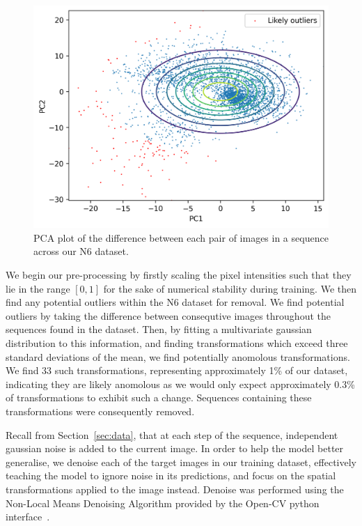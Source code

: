 \documentclass[twocolumn]{article}
\begin{document}
\begin{figure}
    \centering
    \includegraphics[scale=0.4]{assets/change-mag.png}
    \caption{PCA plot of the difference between each pair of images in a sequence across our N6 dataset.}
    \label{fig:change}
\end{figure}

We begin our pre-processing by firstly scaling the pixel intensities such that they lie in the range $[0, 1]$ for the sake of numerical stability during training. We then find any potential outliers within the N6 dataset for removal. We find potential outliers by taking the difference between consequtive images throughout the sequences found in the dataset. Then, by fitting a multivariate gaussian distribution to this information, and finding transformations which exceed three standard deviations of the mean, we find potentially anomolous transformations. We find 33 such transformations, representing approximately 1\% of our dataset, indicating they are likely anomolous as we would only expect approximately 0.3\% of transformations to exhibit such a change. Sequences containing these transformations were consequently removed.

Recall from Section~\ref{sec:data}, that at each step of the sequence, independent gaussian noise is added to the current image. In order to help the model better generalise, we denoise each of the target images in our training dataset, effectively teaching the model to ignore noise in its predictions, and focus on the spatial transformations applied to the image instead. Denoise was performed using the Non-Local Means Denoising Algorithm\cite{buades2005non} provided by the Open-CV python interface~\cite{opencv_library}. 
\end{document}
